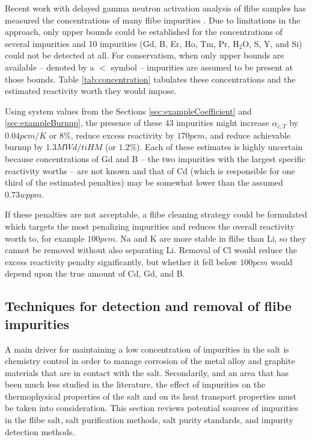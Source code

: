 \documentclass[11pt]{article}
\newcommand{\water}[0]{$\mathrm{H_2O}$}
\begin{document}
Recent work with delayed gamma neutron activation analysis of flibe samples has measured the concentrations of many flibe impurities \cite{ames2013tea}.
Due to limitations in the approach, only upper bounds could be established for the concentrations of several impurities and 10 impurities (Gd, B, Er, Ho, Tm, Pr, \water{}, S, Y, and Si) could not be detected at all.
For conservatism, when only upper bounds are available -- denoted by a $<$ symbol -- impurities are assumed to be present at those bounds.
Table \ref{tab:concentration} tabulates these concentrations and the estimated reactivity worth they would impose.

Using system values from the Sections \ref{sec:exampleCoefficient} and \ref{sec:exampleBurnup}, the presence of these 43 impurities might increase $\alpha_{c,T}$ by $0.04pcm/K$ or $8\%$, reduce excess reactivity by $170pcm$, and reduce achievable burnup by $1.3MWd/tiHM$ (or $1.2\%$).
Each of these estimates is highly uncertain because concentrations of Gd and B -- the two impurities with the largest specific reactivity worths -- are not known and that of Cd (which is responsible for one third of the estimated penalties) may be somewhat lower than the assumed $0.73wppm$.

If these penalties are not acceptable, a flibe cleaning strategy could be formulated which targets the most penalizing impurities and reduces the overall reactivity worth to, for example $100pcm$.
Na and K are more stable in flibe than Li, so they cannot be removed without also separating Li.
Removal of Cl would reduce the excess reactivity penalty significantly, but whether it fell below $100pcm$ would depend upon the true amount of Cd, Gd, and B.

\subsection{Techniques for detection and removal of flibe impurities}

A main driver for maintaining a low concentration of impurities in the salt is chemistry control in order to manage corrosion of the metal alloy and graphite materials that are in contact with the salt.
Secondarily, and an area that has been much less studied in the literature, the effect of impurities on the thermophysical properties of the salt and on its heat transport properties must be taken into consideration.
This section reviews potential sources of impurities in the flibe salt, salt purification methods, salt purity standards, and impurity detection methods.
\end{document}
